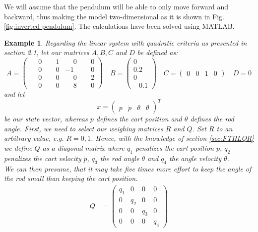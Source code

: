 \documentclass[paper=a4, pagesize, DIV=calc, BCOR=12.5mm, twoside=on, onecolumn=on, open = any, titlepage =on, parskip =half-, headsepline = on, footsepline = on, chapterprefix = on, appendixprefix = off, fontsize = 12pt, numbers = noenddot, abstract = on]{scrbook}
\numberwithin{equation}{chapter}
\theoremstyle{definition}
\theoremstyle{plain}
\newtheorem{beispiel}{Example}
\theoremstyle{plain}
\theoremstyle{remark}
\theoremstyle{plain}
\theoremstyle{plain}
\begin{document}
 We will assume that the pendulum will be able to only move forward and backward, thus making the model two-dimensional as it is shown in Fig.\ref{fig:inverted pendulum}. The calculations have been solved using MATLAB. 
 \vspace*{-0.75cm}
\begin{beispiel} \label{ex:inverted pendulum}
Regarding the linear system with quadratic criteria as presented in section 2.1, let our matrices $A, B, C$ and $D$ be defined as:
\renewcommand\arraystretch{1}
\[A= \left(\begin{array}{cccc}
\phantom{-}0 & \phantom{-}1 & \phantom{-}0 & \phantom{-}0\\
\phantom{-}0&\phantom{-}0&-1&\phantom{-}0\\
\phantom{-}0&\phantom{-}0&\phantom{-}0&\phantom{-}2\\
\phantom{-}0&\phantom{-}0&\phantom{-}8&\phantom{-}0
\end{array}\right)
\quad
B= \begin{pmatrix}
0\\
0.2\\
0\\
-0.1
\end{pmatrix}
\quad
C= \left(\begin{array}{cccc} 
0 & 0 & 1 & 0
\end{array}\right)
\quad D=0
\]
and let 
\[
x = \left( \begin{array}{cccc}
p&\dot{p} & \theta & \dot{\theta}
\end{array} \right)^T
\]
be our state vector, whereas $p$ defines the cart position and $\theta$ defines the rod angle.
First, we need to select our weighing matrices $R$ and $Q$. Set $R$ to an arbitrary value, e.g. $R=0,1$. Hence, with the knowledge of section \ref{sec:FTHLQR} we define $Q$ as a diagonal matrix where $q_1$ penalizes the cart position $p$, $q_2$ penalizes the cart velocity $\dot{p}$, $q_3$ the rod angle $\theta$ and $q_4$ the angle velocity $\dot{\theta}$.\\
We can then presume, that it may take five times more effort to keep the angle of the rod small than keeping the cart position.
\begin{align*}
Q&= \begin{pmatrix}
q_1 & 0 & 0 & 0\\
0& q_2 &0&0\\
0&0&q_3&0\\
0&0&0&q_4
\end{pmatrix}

\end{align*}
\end{beispiel}
\end{document}
